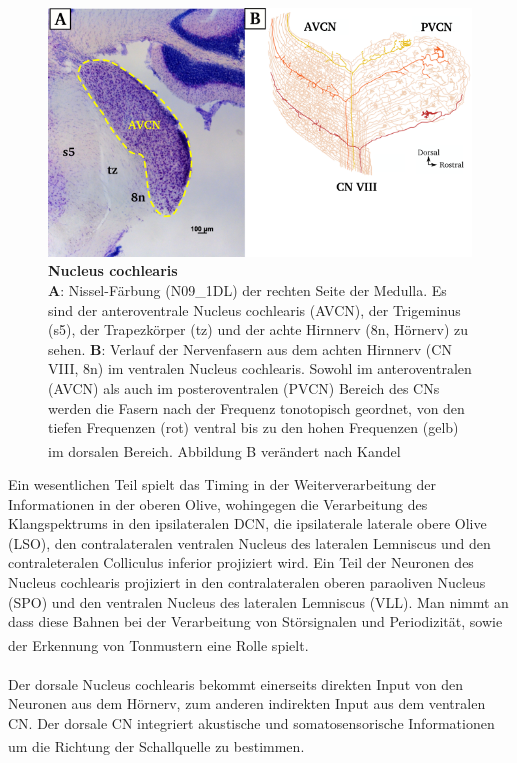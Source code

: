 \documentclass[12pt,a4paper,pdftex]{article}
\begin{document}
\begin{figure}[H]
    \centering
    \includegraphics[width = \textwidth]{pictures/auditory/CN.png}
    \caption[Nucleus cochlearis]{\textbf{Nucleus cochlearis}\\
    \textbf{A}: Nissel-Färbung (N09\_1DL) der rechten Seite der Medulla. Es sind der anteroventrale Nucleus cochlearis (AVCN), der Trigeminus (s5), der Trapezkörper (tz) und der achte Hirnnerv (8n, Hörnerv) zu sehen. \textbf{B}: Verlauf der Nervenfasern aus dem achten Hirnnerv (CN VIII, 8n) im ventralen Nucleus cochlearis. Sowohl im anteroventralen (AVCN) als auch im posteroventralen (PVCN) Bereich des CNs werden die Fasern nach der Frequenz tonotopisch geordnet, von den tiefen Frequenzen (rot) ventral bis zu den hohen Frequenzen (gelb) im dorsalen Bereich. Abbildung B verändert nach Kandel \textsuperscript{\cite[31]{kandel2013principles}}}
    \label{fig:Nucleus_cochlearis}
\end{figure}

\newpage
Ein wesentlichen Teil spielt das Timing in der Weiterverarbeitung der Informationen in der oberen Olive, wohingegen die Verarbeitung des Klangspektrums in den ipsilateralen DCN, die ipsilaterale laterale obere Olive (LSO), den contralateralen ventralen Nucleus des lateralen Lemniscus und den contraleteralen Colliculus inferior projiziert wird. Ein Teil der Neuronen des Nucleus cochlearis projiziert in den contralateralen oberen paraoliven Nucleus (SPO) und den ventralen Nucleus des lateralen Lemniscus (VLL). Man nimmt an dass diese Bahnen bei der Verarbeitung von Störsignalen und Periodizität, sowie der Erkennung von Tonmustern eine Rolle spielt\textsuperscript{\cite[31]{kandel2013principles}}.  
\\\\
\noindent Der dorsale Nucleus cochlearis bekommt einerseits direkten Input von den Neuronen aus dem Hörnerv, zum anderen indirekten Input aus dem ventralen CN. Der dorsale CN integriert akustische  und somatosensorische Informationen um die Richtung der Schallquelle zu bestimmen\textsuperscript{\cite[31]{kandel2013principles}}.
\end{document}
